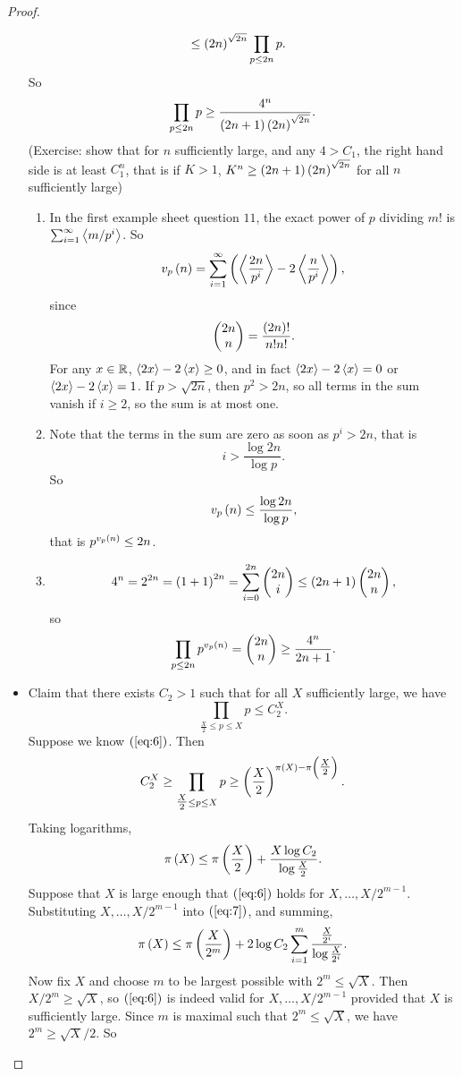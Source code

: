 \begin{proof}
\begin{itemize}
\begin{align*}
& \le \left( 2n \right)^{\sqrt{2n}} \prod_{p \le 2n} p.
\end{align*}
So
$$ \prod_{p \le 2n} p \ge \dfrac{4^n}{\left( 2n + 1 \right)\left( 2n \right)^{\sqrt{2n}}}. $$
(Exercise: show that for $ n $ sufficiently large, and any $ 4 > C_1 $, the right hand side is at least $ C_1^n $, that is if $ K > 1 $, $ K^n \ge \left( 2n + 1 \right)\left( 2n \right)^{\sqrt{2n}} $ for all $ n $ sufficiently large)
\begin{enumerate}
\item In the first example sheet question $ 11 $, the exact power of $ p $ dividing $ m! $ is $ \sum_{i = 1}^\infty \left\langle m / p^i \right\rangle $. So
$$ v_p\left( n \right) = \sum_{i = 1}^\infty \left( \left\langle \dfrac{2n}{p^i} \right\rangle - 2\left\langle \dfrac{n}{p^i} \right\rangle \right), $$
since
$$ \begin{pmatrix} 2n \\ n \end{pmatrix} = \dfrac{\left( 2n \right)!}{n!n!}. $$
For any $ x \in \mathbb{R} $, $ \left\langle 2x \right\rangle - 2\left\langle x \right\rangle \ge 0 $, and in fact $ \left\langle 2x \right\rangle - 2\left\langle x \right\rangle = 0 $ or $ \left\langle 2x \right\rangle - 2\left\langle x \right\rangle = 1 $. If $ p > \sqrt{2n} $, then $ p^2 > 2n $, so all terms in the sum vanish if $ i \ge 2 $, so the sum is at most one.
\item Note that the terms in the sum are zero as soon as $ p^i > 2n $, that is
$$ i > \dfrac{\log 2n}{\log p}. $$
So
$$ v_p\left( n \right) \le \dfrac{\log 2n}{\log p}, $$
that is $ p^{v_p\left( n \right)} \le 2n $.
\item
$$ 4^n = 2^{2n} = \left( 1 + 1 \right)^{2n} = \sum_{i = 0}^{2n} \begin{pmatrix} 2n \\ i \end{pmatrix} \le \left( 2n + 1 \right)\begin{pmatrix} 2n \\ n \end{pmatrix}, $$
so
$$ \prod_{p \le 2n} p^{v_p\left( n \right)} = \begin{pmatrix} 2n \\ n \end{pmatrix} \ge \dfrac{4^n}{2n + 1}. $$
\end{enumerate}
\item Claim that there exists $ C_2 > 1 $ such that for all $ X $ sufficiently large, we have
\begin{equation}
\label{eq:6}
\prod_{\tfrac{X}{2} \le p \le X} p \le C_2^X.
\end{equation}
Suppose we know $ \left( \ref{eq:6} \right) $. Then
$$ C_2^X \ge \prod_{\tfrac{X}{2} \le p \le X} p \ge \left( \dfrac{X}{2} \right)^{\pi\left( X \right) - \pi\left( \tfrac{X}{2} \right)}. $$
Taking logarithms,
\begin{equation}
\label{eq:7}
\pi\left( X \right) \le \pi\left( \dfrac{X}{2} \right) + \dfrac{X\log C_2}{\log \tfrac{X}{2}}.
\end{equation}
Suppose that $ X $ is large enough that $ \left( \ref{eq:6} \right) $ holds for $ X, \dots, X / 2^{m - 1} $. Substituting $ X, \dots, X / 2^{m - 1} $ into $ \left( \ref{eq:7} \right) $, and summing,
$$ \pi\left( X \right) \le \pi\left( \dfrac{X}{2^m} \right) + 2\log C_2\sum_{i = 1}^m \dfrac{\tfrac{X}{2^i}}{\log \tfrac{X}{2^i}}. $$
Now fix $ X $ and choose $ m $ to be largest possible with $ 2^m \le \sqrt{X} $. Then $ X / 2^m \ge \sqrt{X} $, so $ \left( \ref{eq:6} \right) $ is indeed valid for $ X, \dots, X / 2^{m - 1} $ provided that $ X $ is sufficiently large. Since $ m $ is maximal such that $ 2^m \le \sqrt{X} $, we have $ 2^m \ge \sqrt{X} / 2 $. So

\end{itemize}
\end{proof}
